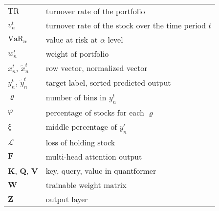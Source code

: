 \documentclass[preprint,12pt]{elsarticle}
\begin{document}
\begin{table}[]
{\begin{tabular}{l|l}
       $\mathrm{TR}$  &  turnover rate of the portfolio\\
       $v^t_n$  & turnover rate of the stock over the time period $t$\\
       $\mathrm{VaR}_{\alpha}$  &  value at risk at $\alpha$ level\\
       $w^t_n$   & weight of portfolio \\
       $x^t_n$, $\tilde{x}^t_n$   & row vector, normalized vector \\
       $y^t_n$, $\tilde{y}^t_n$   &  target label, sorted predicted output \\
       $\varrho$  & number of bins in $y^t_n$ \\
       $\varphi$ & percentage of stocks for each $\varrho$\\
       $\xi$ & middle percentage of $y^t_n$\\
       $\mathcal{L}$   &  loss of holding stock \\
       $\mathbf{F}$  &  multi-head attention output \\
       $\mathbf{K}$, $\mathbf{Q}$, $\mathbf{V}$  &  key, query, value in quantformer \\
       $\mathbf{W}$   & trainable weight matrix \\
       $\mathbf{Z}$  &  output layer \\
         \hline
    \end{tabular}
    \label{tab:my_label}
}%
\end{table}
\end{document}

